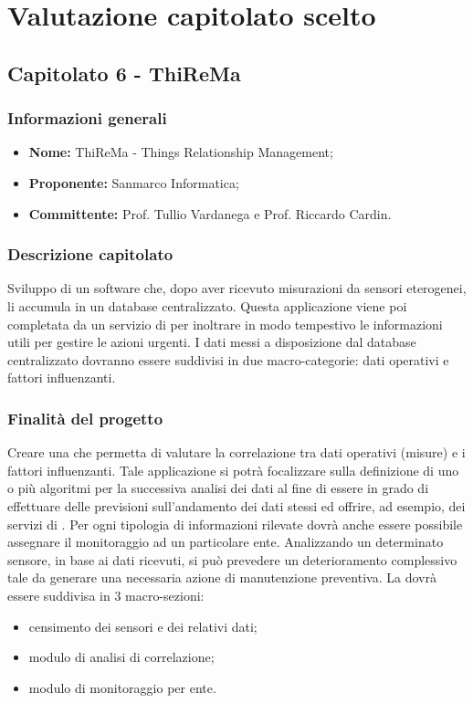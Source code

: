 

\section{Valutazione capitolato scelto}

	\subsection{Capitolato 6 - ThiReMa}

	\subsubsection{Informazioni generali}
	\begin{itemize}
		\item \textbf{Nome:} ThiReMa - Things Relationship Management;
		\item \textbf{Proponente:} Sanmarco Informatica;
		\item \textbf{Committente: }Prof. Tullio Vardanega e Prof. Riccardo Cardin.
	\end{itemize}

	\subsubsection{Descrizione capitolato}
	Sviluppo di un software che,  dopo aver ricevuto misurazioni da sensori eterogenei, li accumula in un database centralizzato. Questa applicazione viene poi completata da un servizio di  per inoltrare in modo tempestivo le informazioni utili per gestire le azioni urgenti.
	I dati messi a disposizione dal database centralizzato dovranno essere suddivisi in due macro-categorie: dati operativi e fattori influenzanti.

	\subsubsection{Finalità del progetto}
	Creare una  che permetta di valutare la correlazione tra dati operativi (misure) e i fattori influenzanti. Tale applicazione si potrà focalizzare sulla definizione di uno o più algoritmi per la successiva analisi dei dati al fine di essere in grado di effettuare delle previsioni sull’andamento dei dati stessi ed offrire, ad esempio, dei servizi di .
	Per ogni tipologia di informazioni rilevate dovrà anche essere possibile assegnare il monitoraggio ad un particolare ente.
	Analizzando un determinato sensore, in base ai dati ricevuti, si può prevedere un deterioramento complessivo tale da generare una necessaria azione di manutenzione preventiva.
	La  dovrà essere suddivisa in 3 macro-sezioni:
	\begin{itemize}
		\item censimento dei sensori e dei relativi dati;
		\item modulo di analisi di correlazione;
		\item modulo di monitoraggio per ente.
	\end{itemize}

